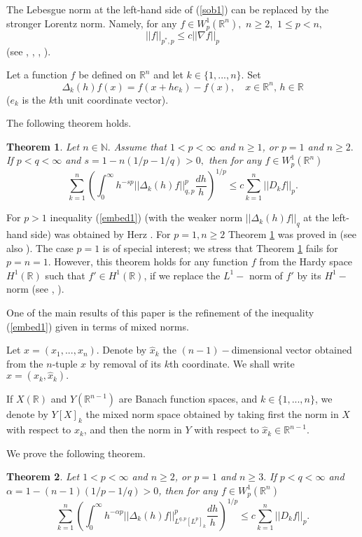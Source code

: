 \documentclass[12pt,twoside,reqno]{amsart}
\numberwithin{equation}{section}
\newtheorem{teo}{Theorem}[section]
\theoremstyle{definition}
\numberwithin{equation}{section}
\def\a{\alpha}
\def\R{\mathbb{R}}
\def\N{\mathbb{N}}
\def\D{\Delta}
\begin{document}
The Lebesgue norm at the left-hand side of (\ref{sob1}) can be replaced by the stronger Lorentz norm.
Namely,  for any $f\in W_p^1(\R^n),\,\, n\ge 2,$ $1\le p< n,$
\begin{equation}\label{embed0}
||f||_{p^*,p}\le c ||\nabla f||_p
\end{equation}
(see  \cite{Al}, \cite{Neil}, \cite{Pe}, \cite{Po}).

Let a function $f$ be defined on $\R^n$ and let
$k\in\{1,...,n\}.$ Set
\begin{equation}\label{Delta}
\Delta_k(h)f(x)= f(x+he_k)-f(x), \quad x\in\R^n,\, h\in \R
\end{equation}
($e_k$ is the $k$th unit coordinate vector).

The following theorem holds.
\begin{teo}\label{1988} Let $n\in \N.$ Assume that $1<p<\infty$ and $n\ge 1$, or $p=1$ and $n\ge 2.$
If $p<q<\infty$ and $s=1-n(1/p-1/q)>0,$ then
 for any $f\in W_p^1(\R^n)$
\begin{equation}\label{embed1}
\sum_{k=1}^n \left(\int_0^\infty h^{-sp}||\D_k(h)f||^p_{q,p}\frac{dh}{h}\right)^{1/p}\le c \sum_{k=1}^n||D_k f||_p.
\end{equation}
\end{teo}
For $p>1$ inequality (\ref{embed1}) (with the weaker norm $||\D_k(h)f||_q$ at the left-hand side) was obtained
by Herz \cite{Herz}. For $p=1, n\ge 2$ Theorem \ref{1988} was proved in \cite{K88} (see also \cite{K93}). The case $p=1$ is of special interest; we stress that
 Theorem \ref{1988} fails for $p=n=1.$ However, this theorem holds for any function $f$ from the Hardy space $H^1(\R)$
such that $f'\in H^1(\R)$, if we replace the $L^1-$ norm of $f'$ by its $H^1-$ norm (see \cite{Oswald}, \cite{K88}).


One of the main results of this paper is the refinement of the inequality (\ref{embed1})   given in terms of
 mixed norms.


Let  $x=(x_1,...,x_n).$  Denote by $\widehat{x}_k$
the $(n-1)-$dimensional vector obtained from the $n$-tuple $x$ by
removal of its $k$th coordinate.
 We shall write
 $x=(x_k,\widehat x_k).$

 If $X(\R)$ and $Y(\R^{n-1})$ are Banach function spaces, and $k\in\{1,...,n\}$, we denote by $Y[X]_k$ the mixed norm space obtained by taking first the norm in $X$ with respect to  $x_k$, and then the norm in $Y$ with respect to $\widehat {x}_k\in \R^{n-1}.$

 We prove the following theorem.
\begin{teo}\label{refined1}
Let $1<p<\infty$ and $n\ge 2$,  or $p=1$ and $n\ge 3.$ If $p<q<\infty$ and $\a=1-(n-1)(1/p-1/q)>0$, then for any $f\in W_p^1(\R^n)$
\begin{equation}\label{embed32}
\sum_{k=1}^n \left(\int_0^\infty h^{-\a p}||\D_k(h)f||^p_{L^{q,p}[L^p]_k}\frac{dh}{h}\right)^{1/p}\le c \sum_{k=1}^n||D_k f||_p.
\end{equation}
\end{teo}
\end{document}
